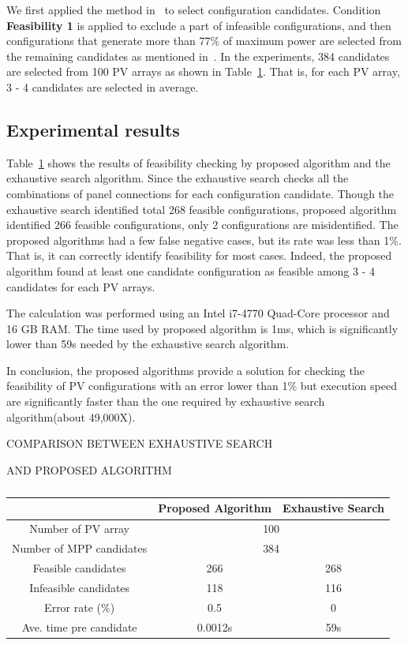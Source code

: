 \documentclass[journal]{IEEEtran}
\begin{document}
We first applied the method in~\cite{Orozco-Gutierrez2016} to select configuration candidates.
Condition \textbf{Feasibility 1} is applied to exclude a part of infeasible configurations, and then configurations that generate more than 77\% of maximum power are selected from the remaining candidates as mentioned in~\cite{Orozco-Gutierrez2016}.
In the experiments, 384 candidates are selected from 100 PV arrays as shown in Table~\ref{tab:result}.
That is, for each PV array, 3 - 4 candidates are selected in average.

\subsection{Experimental results}\label{sec:experimental-results}
Table~\ref{tab:result} shows the results of feasibility checking by proposed algorithm and the exhaustive search algorithm.
Since the exhaustive search checks all the combinations of panel connections for each configuration candidate.
Though the exhaustive search identified total 268 feasible configurations, proposed algorithm identified 266 feasible configurations, only 2 configurations are misidentified.
The proposed algorithms had a few false negative cases, but its rate was less than 1\%.
That is, it can correctly identify feasibility for most cases. Indeed, the proposed algorithm found at least one candidate configuration as feasible among 3 - 4 candidates for each PV arrays.

The calculation was performed using an Intel i7-4770 Quad-Core processor and 16 GB RAM.
The time used by proposed algorithm is 1ms, which is significantly lower than 59s needed by the exhaustive search algorithm.

In conclusion, the proposed algorithms provide a solution for checking the feasibility of PV configurations with an error lower than 1\% but execution speed are significantly faster than the one required by exhaustive search algorithm(about 49,000X).
\begin{table}[htbp]
\caption[]{\label{tab:result} }
\centerline{COMPARISON BETWEEN EXHAUSTIVE SEARCH}
\centerline{AND PROPOSED ALGORITHM}
  \vskip5pt
\begin{tabular}{c|c|c}
  \hline
  \hline
                         & Proposed Algorithm & Exhaustive Search \\ \hline
Number of PV array       & \multicolumn{2}{c}{100}               \\ \hline
Number of MPP candidates & \multicolumn{2}{c}{384}               \\ \hline
Feasible candidates      & 266                & 268               \\ \hline
Infeasible candidates    & 118                & 116               \\ \hline
Error rate (\%)          & 0.5                & 0                 \\ \hline
Ave. time pre candidate  & 0.0012s            & 59s               \\ \hline
\end{tabular}
\end{table}
\end{document}
